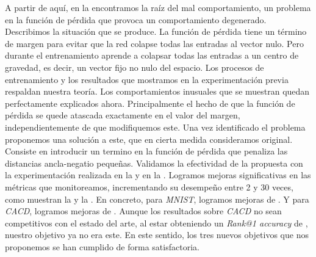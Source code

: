 A partir de aquí, en la  encontramos la raíz del mal comportamiento, un problema en la función de pérdida que provoca un comportamiento degenerado. Describimos la situación que se produce. La función de pérdida tiene un término de margen para evitar que la red colapse todas las entradas al vector nulo. Pero durante el entrenamiento aprende a colapsar todas las entradas a un centro de gravedad, es decir, un vector fijo no nulo del espacio. Los procesos de entrenamiento y los resultados que mostramos en la experimentación previa respaldan nuestra teoría. Los comportamientos inusuales que se muestran quedan perfectamente explicados ahora. Principalmente el hecho de que la función de pérdida se quede atascada exactamente en el valor del margen, independientemente de que modifiquemos este. Una vez identificado el problema proponemos una solución a este, que en cierta medida consideramos original. Consiste en introducir un termino en la función de pérdida que penaliza las distancias ancla-negatio pequeñas. Validamos la efectividad de la propuesta con la experimentación realizada en la  y en la . Logramos mejoras significativas en las métricas que monitoreamos, incrementando su desempeño entre 2 y 30 veces, como muestran la  y la . En concreto, para \textit{MNIST}, logramos mejoras de . Y para \textit{CACD}, logramos mejoras de . Aunque los resultados sobre \textit{CACD} no sean competitivos con el estado del arte, al estar obteniendo un \textit{Rank@1 accuracy} de , nuestro objetivo ya no era este. En este sentido, los tres nuevos objetivos que nos proponemos se han cumplido de forma satisfactoria.

